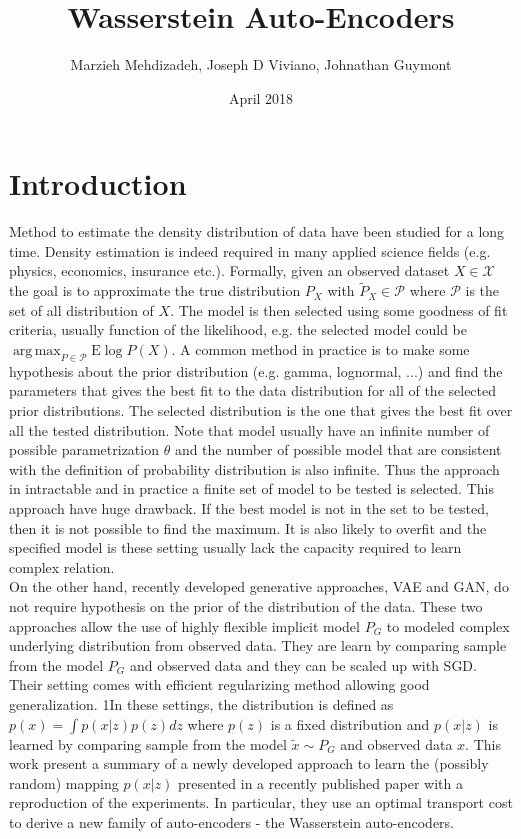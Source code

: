 \documentclass[12pt,english]{amsart}
\title{Wasserstein Auto-Encoders}
\author{Marzieh Mehdizadeh, Joseph D Viviano, Johnathan Guymont}
\date{April 2018}
\newcommand{\E}{\mathrm{E}}
\DeclareMathOperator*{\argmax}{arg\,max}
\begin{document}
\maketitle

\section{Introduction}

Method to estimate the density distribution of data have been studied for a long time. Density estimation is indeed required in many applied science fields (e.g. physics, economics, insurance etc.). Formally, given an observed dataset $X\in\mathcal{X}$ the goal is to approximate the true distribution $P_X$ with $\tilde{P}_X\in\mathcal{P}$ where $\mathcal{P}$ is the set of all distribution of $X$. The model is then selected using some goodness of fit criteria, usually function of the likelihood, e.g. the selected model could be $\argmax_{P\in\mathcal{P}}\E \log P(X)$. A common method in practice is to make some hypothesis about the prior distribution (e.g. gamma, lognormal, ...) and find the parameters that gives the best fit to the data distribution for all of the selected prior distributions. The selected distribution is the one that gives the best fit over all the tested distribution. Note that model usually have an infinite number of possible parametrization $\theta$ and the number of possible model that are consistent with the definition of probability distribution is also infinite. Thus the approach in intractable and in practice a finite set of model to be tested is selected. This approach have huge drawback. If the best model is not in the set to be tested, then it is not possible to find the maximum. It is also likely to overfit and the specified model is these setting usually lack the capacity required to learn complex relation. \\

On the other hand, recently developed generative approaches, VAE and GAN, do not require hypothesis on the prior of the distribution of the data. These two approaches allow the use of highly flexible implicit model $P_G$ to modeled complex underlying distribution from observed data. They are learn by comparing sample from the model $P_G$ and observed data and they can be scaled up with SGD. Their setting comes with efficient regularizing method allowing good generalization. 1In these settings, the distribution is defined as $p(x) = \int p(x|z)p(z)dz$ where $p(z)$ is a fixed distribution and $p(x|z)$ is learned by comparing sample from the model $\tilde{x}\sim P_G$ and observed data $x$. This work present a summary of a newly developed approach to learn the (possibly random) mapping $p(x|z)$ presented in a recently published paper \cite{2017arXiv171101558T} with a reproduction of the experiments. In particular, they use an optimal transport cost to derive a new family of auto-encoders - the Wasserstein auto-encoders.
\end{document}
